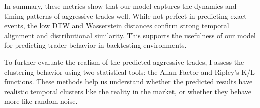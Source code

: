 
In summary, these metrics show that our model captures the dynamics and timing patterns of aggressive trades well. While not perfect in predicting exact events, the low DTW and Wasserstein distances confirm strong temporal alignment and distributional similarity. This supports the usefulness of our model for predicting trader behavior in backtesting environments.



To further evaluate the realism of the predicted aggressive trades, I assess the clustering behavior using two statistical tools: the Allan Factor and Ripley's K/L functions. These methods help us understand whether the predicted results have realistic temporal clusters like the reality in the market, or whether they behave more like random noise.

